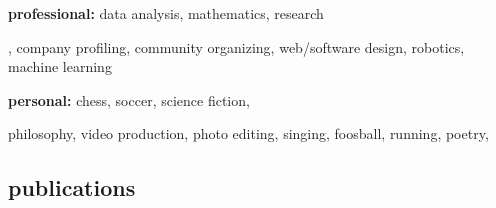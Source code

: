 \documentclass[]{friggeri-cv} %
\begin{document}
\textbf{professional:} data analysis, mathematics, research
\begin{detailed}
, company profiling,  community organizing, web/software design, robotics, machine learning \\
\end{detailed}
\textbf{personal:} chess, soccer, science fiction,
\begin{detailed} 
philosophy, video production, photo editing, singing, foosball, running, poetry,
\end{detailed}

\begin{pubs}
\section{publications}



\begin{refsection} %
\nocite{*}
\printbibliography[sorting=chronological, type=inproceedings, title={international peer-reviewed conferences/proceedings}, notkeyword={france}, heading=subbibliography]
\end{refsection}

\begin{refsection} %
\nocite{*}
\printbibliography[sorting=chronological, type=inproceedings, title={local peer-reviewed conferences/proceedings}, keyword={france}, heading=subbibliography]
\end{refsection}


\end{pubs}

\begin{transcript}

\end{transcript}

\end{document}
